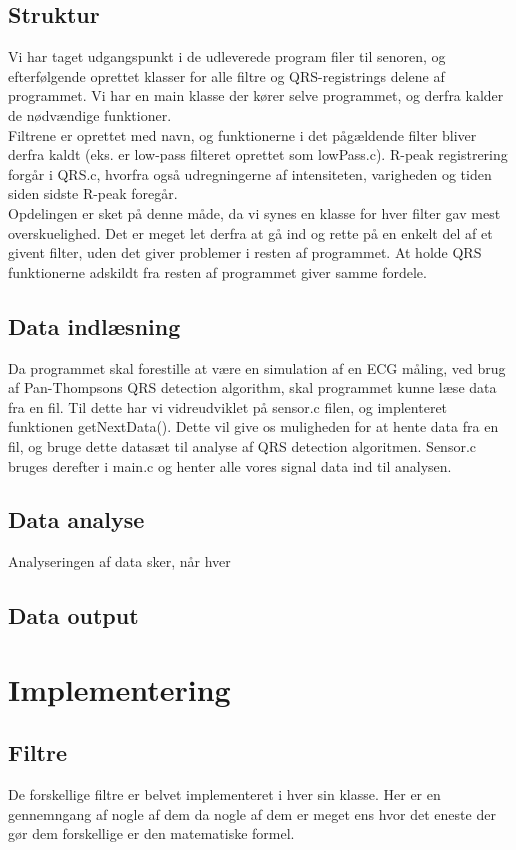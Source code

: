 \documentclass[a4paper,12pt]{article}
\begin{document}
\subsection*{Struktur}
Vi har taget udgangspunkt i de udleverede program filer til senoren, og efterfølgende oprettet klasser for alle filtre og QRS-registrings delene af programmet. Vi har en main klasse der kører selve programmet, og derfra kalder de nødvændige funktioner.\\
Filtrene er oprettet med navn, og funktionerne i det pågældende filter bliver derfra kaldt (eks. er low-pass filteret oprettet som lowPass.c). R-peak registrering forgår i QRS.c, hvorfra også udregningerne af intensiteten, varigheden og tiden siden sidste R-peak foregår.\\
Opdelingen er sket på denne måde, da vi synes en klasse for hver filter gav mest overskuelighed. Det er meget let derfra at gå ind og rette på en enkelt del af et givent filter, uden det giver problemer i resten af programmet. At holde QRS funktionerne adskildt fra resten af programmet giver samme fordele. 
\subsection{Data indlæsning}
Da programmet skal forestille at være en simulation af en ECG måling, ved brug af Pan-Thompsons QRS detection algorithm, skal programmet kunne læse data fra en fil. Til dette har vi vidreudviklet på sensor.c filen, og implenteret funktionen getNextData(). Dette vil give os muligheden for at hente data fra en fil, og bruge dette datasæt til analyse af QRS detection algoritmen. Sensor.c bruges derefter i main.c og henter alle vores signal data ind til analysen.
\subsection{Data analyse}
Analyseringen af data sker, når hver 
\subsection{Data output}
\section{Implementering}
\subsection{Filtre}
De forskellige filtre er belvet implementeret i hver sin klasse. Her er en gennemngang af nogle af dem da nogle af dem er meget ens hvor det eneste der gør dem forskellige er den matematiske formel.
\end{document}
